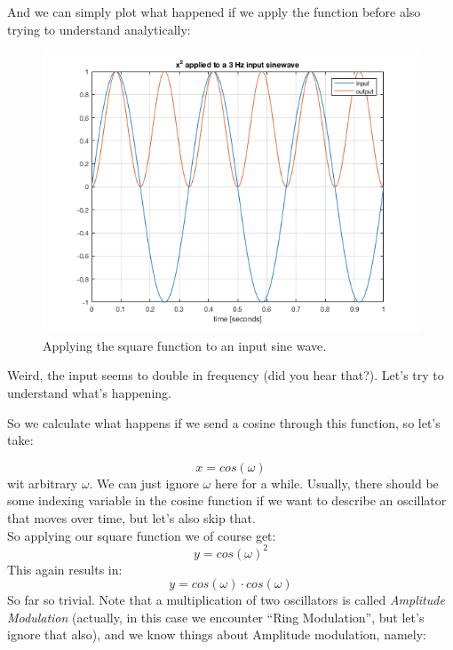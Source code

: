 And we can simply plot what happened if we apply the function before also trying to understand analytically:


\begin{figure}[H]
	\begin{center}
		\includegraphics[width = 14cm]{img/sinSquared.png}
		\caption{Applying the square function to an input sine wave.}
		\label{fig:sinSquared}
	\end{center}
\end{figure}


Weird, the input seems to double in frequency (did you hear that?). Let's try to understand what's happening.\

So we calculate what happens if we send a cosine through this function, so let's take:

\begin{equation}
x = cos(\omega)
\end{equation}
wit arbitrary $\omega$. We can just ignore $\omega$ here for a while. Usually, there should be some indexing variable in the cosine function if we want to describe an oscillator that moves over time, but let's also skip that.\\
So applying our square function we of course get:
\begin{equation}
y = cos(\omega)^2
\end{equation}
This again results in:
\begin{equation}
y = cos(\omega) \cdot cos(\omega)
\end{equation}
So far so trivial. Note that a multiplication of two oscillators is called \textit{Amplitude Modulation} (actually, in this case we encounter ``Ring Modulation'', but let's ignore that also), and we know things about Amplitude modulation, namely:\

